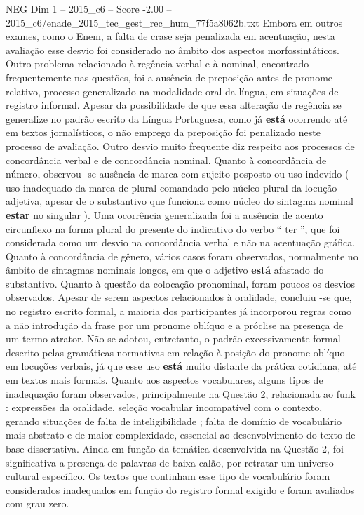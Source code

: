 \begin{textsample}{NEG Dim 1 – 2015\_c6 – Score -2.00 – 2015\_c6/enade\_2015\_tec\_gest\_rec\_hum\_77f5a8062b.txt}
Embora em outros exames, como o Enem, a falta de crase seja penalizada em acentuação, nesta avaliação esse desvio foi considerado no âmbito dos aspectos morfossintáticos.
Outro problema relacionado à regência verbal e à nominal, encontrado frequentemente nas questões, foi a ausência de preposição antes de pronome relativo, processo generalizado na modalidade oral da língua, em situações de registro informal.
Apesar da possibilidade de que essa alteração de regência se generalize no padrão escrito da Língua Portuguesa, como já \textbf{está} ocorrendo até em textos jornalísticos, o não emprego da preposição foi penalizado neste processo de avaliação.
Outro desvio muito frequente diz respeito aos processos de concordância verbal e de concordância nominal.
Quanto à concordância de número, observou -se ausência de marca com sujeito posposto ou uso indevido ( uso inadequado da marca de plural comandado pelo núcleo plural da locução adjetiva, apesar de o substantivo que funciona como núcleo do sintagma nominal \textbf{estar} no singular ).
Uma ocorrência generalizada foi a ausência de acento circunflexo na forma plural do presente do indicativo do verbo “ ter ”, que foi considerada como um desvio na concordância verbal e não na acentuação gráfica.
Quanto à concordância de gênero, vários casos foram observados, normalmente no âmbito de sintagmas nominais longos, em que o adjetivo \textbf{está} afastado do substantivo.
Quanto à questão da colocação pronominal, foram poucos os desvios observados.
Apesar de serem aspectos relacionados à oralidade, concluiu -se que, no registro escrito formal, a maioria dos participantes já incorporou regras como a não introdução da frase por um pronome oblíquo e a próclise na presença de um termo atrator.
Não se adotou, entretanto, o padrão excessivamente formal descrito pelas gramáticas normativas em relação à posição do pronome oblíquo em locuções verbais, já que esse uso \textbf{está} muito distante da prática cotidiana, até em textos mais formais.
Quanto aos aspectos vocabulares, alguns tipos de inadequação foram observados, principalmente na Questão 2, relacionada ao funk : expressões da oralidade, seleção vocabular incompatível com o contexto, gerando situações de falta de inteligibilidade ; falta de domínio de vocabulário mais abstrato e de maior complexidade, essencial ao desenvolvimento do texto de base dissertativa.
Ainda em função da temática desenvolvida na Questão 2, foi significativa a presença de palavras de baixa calão, por retratar um universo cultural específico.
Os textos que continham esse tipo de vocabulário foram considerados inadequados em função do registro formal exigido e foram avaliados com grau zero.

\end{textsample}
